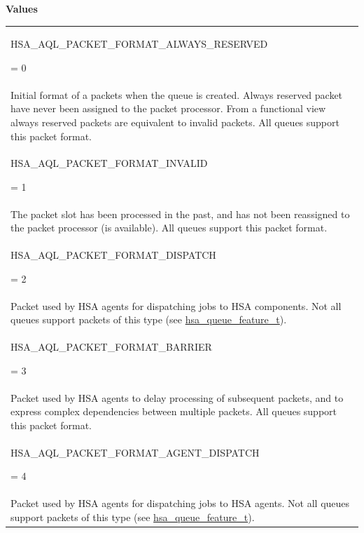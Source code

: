 \documentclass[final]{book}
\newcommand{\reftyp}[1]{#1}
\newcommand{\refenu}[1]{\reftyp{#1}}
\begin{document}
\noindent\textbf{Values}\\[-5mm]
\begin{longtable}{@{\hspace{2em}}p{\linewidth-2em}}
\hspace{-2em}\hypertarget{group__aql_1gga21e03ac6edb26e457468af5fe501b7adaaa022c87937de2531388a681182e4d36}{\refenu{HSA_AQL_PACKET_FORMAT_ALWAYS_RESERVED}} = 0\\Initial format of a packets when the queue is created. Always reserved packet have never been assigned to the packet processor. From a functional view always reserved packets are equivalent to invalid packets. All queues support this packet format.\\[2mm]
\hspace{-2em}\hypertarget{group__aql_1gga21e03ac6edb26e457468af5fe501b7adadc0bb64d5b0037718e716d57f6befb6a}{\refenu{HSA_AQL_PACKET_FORMAT_INVALID}} = 1\\The packet slot has been processed in the past, and has not been reassigned to the packet processor (is available). All queues support this packet format.\\[2mm]
\hspace{-2em}\hypertarget{group__aql_1gga21e03ac6edb26e457468af5fe501b7ada90d2a5dbd40f372f777402c83edf9d86}{\refenu{HSA_AQL_PACKET_FORMAT_DISPATCH}} = 2\\Packet used by HSA agents for dispatching jobs to HSA components. Not all queues support packets of this type (see \hyperlink{group__queue_1ga1145b01f6d9e2670179a22c92db39413}{hsa_queue_feature_t}).\\[2mm]
\hspace{-2em}\hypertarget{group__aql_1gga21e03ac6edb26e457468af5fe501b7adadaf10ccf48d374dfa87b7ad237a1788d}{\refenu{HSA_AQL_PACKET_FORMAT_BARRIER}} = 3\\Packet used by HSA agents to delay processing of subsequent packets, and to express complex dependencies between multiple packets. All queues support this packet format.\\[2mm]
\hspace{-2em}\hypertarget{group__aql_1gga21e03ac6edb26e457468af5fe501b7ada5189936e5f67be9e3463465aed69b008}{\refenu{HSA_AQL_PACKET_FORMAT_AGENT_DISPATCH}} = 4\\Packet used by HSA agents for dispatching jobs to HSA agents. Not all queues support packets of this type (see \hyperlink{group__queue_1ga1145b01f6d9e2670179a22c92db39413}{hsa_queue_feature_t}).
\end{longtable}
\end{document}
